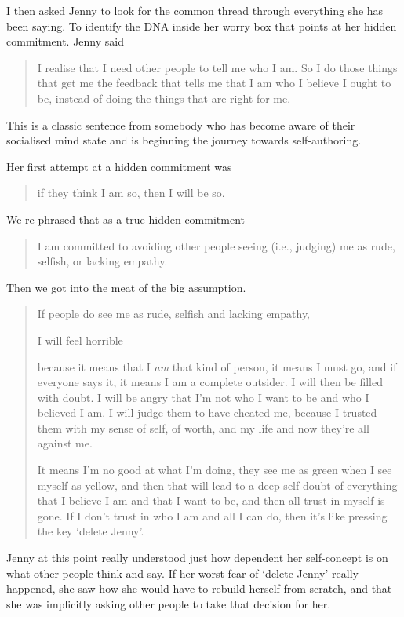 \begin{longstoryblock}
I then asked Jenny to look for the common thread through everything she has been saying. To identify the DNA inside her worry box that points at her hidden commitment. Jenny said 
\begin{quote}
I realise that I need other people to tell me who I am. So I do those things that get me the feedback that tells me that I am who I believe I ought to be, instead of doing the things that are right for me.
\end{quote}


This is a classic sentence from somebody who has become aware of their socialised mind state and is beginning the journey towards self-authoring.


 Her first attempt at a hidden commitment was 
\begin{quote} 
if they think I am so, then I will be so.
\end{quote} 


 We re-phrased that as a true hidden commitment 
\begin{quote} 
I am committed to avoiding other people seeing (i.e., judging) me as rude, selfish, or lacking empathy.
 \end{quote}


Then we got into the meat of the big assumption. 


\begin{quote} 
If people do see me as rude, selfish and lacking empathy, 


I will feel horrible 


because it means that I \emph{am} that kind of person, it means I must go, and if everyone says it, it means I am a complete outsider. I will then be filled with doubt. I will be angry that I'm not who I want to be and who I believed I am. I will judge them to have cheated me, because I trusted them with my sense of self, of worth, and my life and now they're all against me.


It means I'm no good at what I'm doing, they see me as green when I see myself as yellow, and then that will lead to a deep self-doubt of everything that I believe I am and that I want to be, and then all trust in myself is gone. If I don't trust in who I am and all I can do, then it's like pressing the key ‘delete Jenny’.
\end{quote} 


Jenny at this point really understood just how dependent her self-concept is on what other people think and say. If her worst fear of ‘delete Jenny’ really happened, she saw how she would have to rebuild herself from scratch, and that she was implicitly asking other people to take that decision for her.



\end{longstoryblock}
